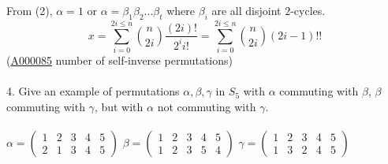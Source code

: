 \documentclass{article}
\begin{document}
\begin{siderules}
\null\qquad From \color{gray}(2)\color{black}, \(\alpha=1\) or \(\alpha=\beta_1\beta_2...\beta_t\) where \(\beta_i\) are all disjoint \(2\)-cycles.
\[x=\sum_{i=0}^{2i\le n}{\binom{n}{2i}\frac{(2i)!}{2^ii!}}=\sum_{i=0}^{2i\le n}{\binom{n}{2i}(2i-1)!!}\]
\null\qquad(\href{https://oeis.org/A000085}{A000085} number of self-inverse permutations)\\\\
\color{blue}4. Give an example of permutations \(\alpha,\beta,\gamma\) in \(S_5\) with \(\alpha\) commuting with \(\beta\), \(\beta\) commuting with \(\gamma\), but with \(\alpha\) not commuting with \(\gamma\).\color{black}\\\\
\(\alpha=\begin{pmatrix}1 & 2 & 3 & 4 & 5\\2 & 1 & 3 & 4 & 5\end{pmatrix}\) \(\beta=\begin{pmatrix}1 & 2 & 3 & 4 & 5\\1 & 2 & 3 & 5 & 4\end{pmatrix}\) \(\gamma=\begin{pmatrix}1 & 2 & 3 & 4 & 5\\1 & 3 & 2 & 4 & 5\end{pmatrix}\)
\end{siderules}
\end{document}
